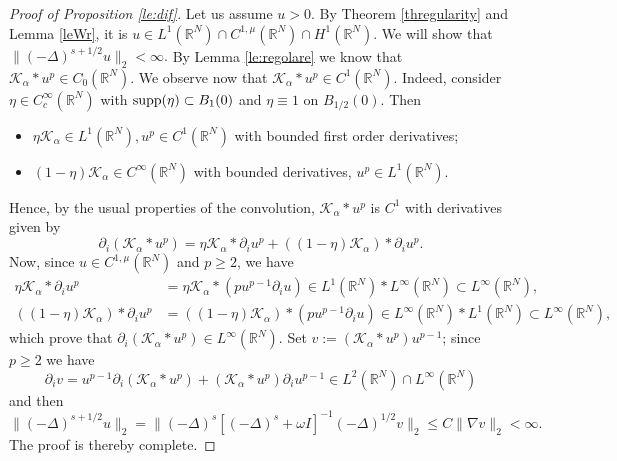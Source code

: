 \documentclass[10pt]{amsart}
\numberwithin{equation}{section}
\begin{document}
 \begin{proof}[Proof of Proposition \ref{le:dif}]
Let us assume $u>0$. By  Theorem \ref{thregularity} and   Lemma \ref{leWr},
it is  $u\in L^{1}(\mathbb R^{N})\cap C^{1,\mu}(\mathbb R^{N})\cap H^{1}(\mathbb R^{N})$.
We will show that $\|(-\Delta)^{s+1/2}u\|_{2}<\infty.$
By Lemma \ref{le:regolare} we know that $\mathcal K_{\alpha}*u^{p}\in C_{0}(\mathbb R^{N})$.
We  observe now that $\mathcal K_{\alpha}*u^{p}\in C^{1}(\mathbb R^{N})$.
Indeed,
consider $\eta\in C^{\infty}_{c}(\mathbb R^{N})$ with ${\rm supp}(\eta)\subset B_{1}(0)$
and $\eta\equiv1$ on $B_{1/2}(0).$
Then 
\begin{itemize}
\item $\eta\mathcal K_{\alpha}\in L^{1}(\mathbb R^{N}), u^{p}\in C^{1} (\mathbb R^{N})$ with bounded first order derivatives;
\item $(1-\eta)\mathcal K_{\alpha} \in C^{\infty}(\mathbb R^{N})$ with bounded derivatives, $u^{p}\in L^{1}(\mathbb R^{N}).$
\end{itemize}
Hence, by the usual properties of the convolution,
$\mathcal K_{\alpha}*u^{p}$ is $C^{1}$ with derivatives
given by 
\[
\partial_{i}(\mathcal K_{\alpha}*u^{p})
=
\eta\mathcal K_{\alpha}*\partial_{i}u^{p}
+((1-\eta)\mathcal K_{\alpha})*\partial_{i}u^{p}.
\]
Now,  since $u\in C^{1,\mu}(\mathbb R^{N})$ and $p\geq 2$, we have 
\begin{align*}
\eta\mathcal K_{\alpha}*\partial_{i}u^{p}
&=
\eta\mathcal K_{\alpha}*(p u^{p-1}\partial_{i}u)
\in L^{1}(\mathbb R^{N})*L^{\infty}(\mathbb R^{N}) 
\subset L^{\infty}(\mathbb R^{N}),\\
((1-\eta)\mathcal K_{\alpha})*\partial_{i}u^{p}
&=
((1-\eta)\mathcal K_{\alpha})*(p u^{p-1}\partial_{i}u)
\in L^{\infty}(\mathbb R^{N})*L^{1}(\mathbb R^{N}) 
\subset L^{\infty}(\mathbb R^{N}),
\end{align*}
which prove  that $\partial_{i}(\mathcal K_{\alpha}*u^{p})\in L^{\infty}(\mathbb R^{N})$.
Set $v:=(\mathcal K_{\alpha}*u^{p})u^{p-1}$; since $p\geq 2$ we have
\begin{equation}\label{quasifine}
\partial_{i} v = u^{p-1}\partial_{i}(\mathcal K_{\alpha}*u^{p})+(\mathcal K_{\alpha}*u^{p})\partial_{i} u^{p-1} \in L^{2}(\mathbb R^{N})\cap L^{\infty}(\mathbb R^{N})
\end{equation}
and then 
\begin{equation*} 
\|(-\Delta)^{s+1/2}u\|_{2}=\|(-\Delta)^{s} [(-\Delta)^{s}+\omega I]^{-1}(-\Delta)^{1/2}v\|_{2}\leq C \|\nabla v\|_{2}<\infty.
\end{equation*}
The proof  is thereby complete.
\end{proof}
\end{document}
